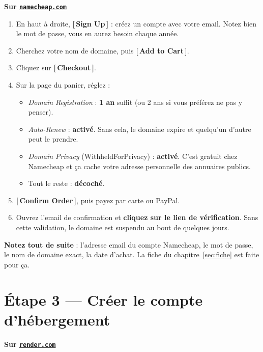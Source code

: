\documentclass[11pt,a4paper]{article}
\newcommand{\bouton}[1]{\textbf{\textcolor{sig}{[\,#1\,]}}}
\newcommand{\champ}[1]{\textit{#1}}
\newcommand{\lien}[2]{\href{#1}{\texttt{#2}}}
\begin{document}
\begin{etape}
\textbf{Sur \lien{https://www.namecheap.com}{namecheap.com}}
\end{etape}

\begin{enumerate}
  \item En haut à droite, \bouton{Sign Up} : créez un compte avec votre email.
        Notez bien le mot de passe, vous en aurez besoin chaque année.
  \item Cherchez votre nom de domaine, puis \bouton{Add to Cart}.
  \item Cliquez sur \bouton{Checkout}.
  \item Sur la page du panier, réglez :
  \begin{itemize}
    \item \champ{Domain Registration} : \textbf{1 an} suffit (ou 2 ans si vous
          préférez ne pas y penser).
    \item \champ{Auto-Renew} : \textbf{activé}. Sans cela, le domaine expire et
          quelqu'un d'autre peut le prendre.
    \item \champ{Domain Privacy} (WithheldForPrivacy) : \textbf{activé}. C'est
          gratuit chez Namecheap et ça cache votre adresse personnelle des
          annuaires publics.
    \item Tout le reste : \textbf{décoché}.
  \end{itemize}
  \item \bouton{Confirm Order}, puis payez par carte ou PayPal.
  \item Ouvrez l'email de confirmation et \textbf{cliquez sur le lien de
        vérification}. Sans cette validation, le domaine est suspendu au bout de
        quelques jours.
\end{enumerate}

\begin{conseil}
\textbf{Notez tout de suite} : l'adresse email du compte Namecheap, le mot de
passe, le nom de domaine exact, la date d'achat. La fiche du
chapitre~\ref{sec:fiche} est faite pour ça.
\end{conseil}

\section{Étape 3 — Créer le compte d'hébergement}

\begin{etape}
\textbf{Sur \lien{https://render.com}{render.com}}
\end{etape}
\end{document}
